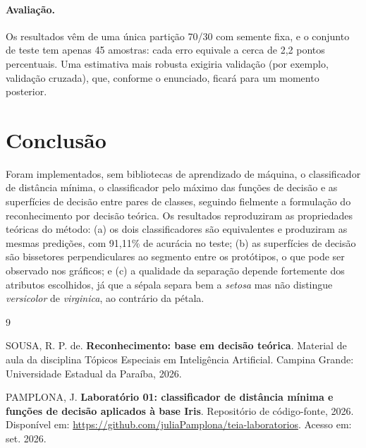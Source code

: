 \documentclass[12pt,a4paper]{article}
\newcommand{\repositorio}{\url{https://github.com/juliaPamplona/teia-laboratorios}}
\begin{document}
\paragraph{Avaliação.} Os resultados vêm de uma única partição 70/30 com semente fixa, e o conjunto de teste tem apenas 45 amostras: cada erro equivale a cerca de 2,2 pontos percentuais. Uma estimativa mais robusta exigiria validação (por exemplo, validação cruzada), que, conforme o enunciado, ficará para um momento posterior.

\section{Conclusão}

Foram implementados, sem bibliotecas de aprendizado de máquina, o classificador de distância mínima, o classificador pelo máximo das funções de decisão e as superfícies de decisão entre pares de classes, seguindo fielmente a formulação do reconhecimento por decisão teórica. Os resultados reproduziram as propriedades teóricas do método: (a) os dois classificadores são equivalentes e produziram as mesmas predições, com 91,11\% de acurácia no teste; (b) as superfícies de decisão são bissetores perpendiculares ao segmento entre os protótipos, o que pode ser observado nos gráficos; e (c) a qualidade da separação depende fortemente dos atributos escolhidos, já que a sépala separa bem a \emph{setosa} mas não distingue \emph{versicolor} de \emph{virginica}, ao contrário da pétala.

\begin{thebibliography}{9}

SOUSA, R. P. de. \textbf{Reconhecimento: base em decisão teórica}. Material de aula da disciplina Tópicos Especiais em Inteligência Artificial. Campina Grande: Universidade Estadual da Paraíba, 2026.

PAMPLONA, J. \textbf{Laboratório 01: classificador de distância mínima e funções de decisão aplicados à base Iris}. Repositório de código-fonte, 2026. Disponível em: \repositorio. Acesso em: set. 2026.

\end{thebibliography}
\end{document}
